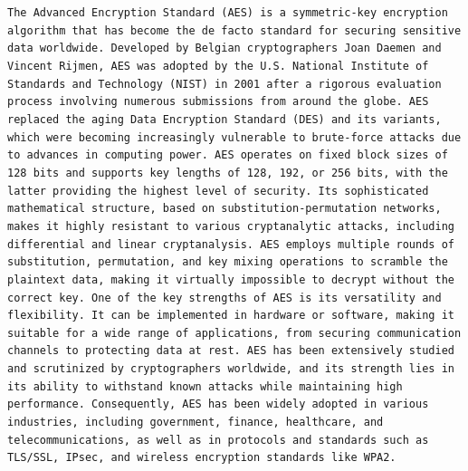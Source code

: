 \texttt{The Advanced Encryption Standard (AES) is a symmetric-key encryption algorithm that has become the de facto standard for securing sensitive data worldwide. Developed by Belgian cryptographers Joan Daemen and Vincent Rijmen, AES was adopted by the U.S. National Institute of Standards and Technology (NIST) in 2001 after a rigorous evaluation process involving numerous submissions from around the globe. AES replaced the aging Data Encryption Standard (DES) and its variants, which were becoming increasingly vulnerable to brute-force attacks due to advances in computing power. AES operates on fixed block sizes of 128 bits and supports key lengths of 128, 192, or 256 bits, with the latter providing the highest level of security. Its sophisticated mathematical structure, based on substitution-permutation networks, makes it highly resistant to various cryptanalytic attacks, including differential and linear cryptanalysis. AES employs multiple rounds of substitution, permutation, and key mixing operations to scramble the plaintext data, making it virtually impossible to decrypt without the correct key. One of the key strengths of AES is its versatility and flexibility. It can be implemented in hardware or software, making it suitable for a wide range of applications, from securing communication channels to protecting data at rest. AES has been extensively studied and scrutinized by cryptographers worldwide, and its strength lies in its ability to withstand known attacks while maintaining high performance. Consequently, AES has been widely adopted in various industries, including government, finance, healthcare, and telecommunications, as well as in protocols and standards such as TLS/SSL, IPsec, and wireless encryption standards like WPA2.}

